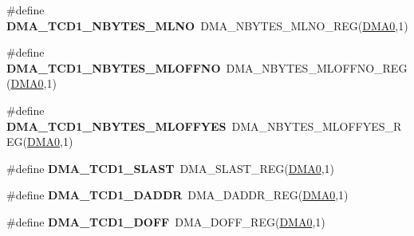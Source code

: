 \begin{DoxyCompactItemize}
\item 
\#define {\bfseries D\+M\+A\+\_\+\+T\+C\+D1\+\_\+\+N\+B\+Y\+T\+E\+S\+\_\+\+M\+L\+NO}~D\+M\+A\+\_\+\+N\+B\+Y\+T\+E\+S\+\_\+\+M\+L\+N\+O\+\_\+\+R\+EG(\hyperlink{group__DMA__Peripheral__Access__Layer_ga4103044f9ca209772f513dc694513ffb}{D\+M\+A0},1)\hypertarget{group__DMA__Register__Accessor__Macros_ga815c5f40d67ad04ac54fdb097ba16f7f}{}\label{group__DMA__Register__Accessor__Macros_ga815c5f40d67ad04ac54fdb097ba16f7f}

\item 
\#define {\bfseries D\+M\+A\+\_\+\+T\+C\+D1\+\_\+\+N\+B\+Y\+T\+E\+S\+\_\+\+M\+L\+O\+F\+F\+NO}~D\+M\+A\+\_\+\+N\+B\+Y\+T\+E\+S\+\_\+\+M\+L\+O\+F\+F\+N\+O\+\_\+\+R\+EG(\hyperlink{group__DMA__Peripheral__Access__Layer_ga4103044f9ca209772f513dc694513ffb}{D\+M\+A0},1)\hypertarget{group__DMA__Register__Accessor__Macros_gad6f0e77e436a6181f1de8a5c76f852e4}{}\label{group__DMA__Register__Accessor__Macros_gad6f0e77e436a6181f1de8a5c76f852e4}

\item 
\#define {\bfseries D\+M\+A\+\_\+\+T\+C\+D1\+\_\+\+N\+B\+Y\+T\+E\+S\+\_\+\+M\+L\+O\+F\+F\+Y\+ES}~D\+M\+A\+\_\+\+N\+B\+Y\+T\+E\+S\+\_\+\+M\+L\+O\+F\+F\+Y\+E\+S\+\_\+\+R\+EG(\hyperlink{group__DMA__Peripheral__Access__Layer_ga4103044f9ca209772f513dc694513ffb}{D\+M\+A0},1)\hypertarget{group__DMA__Register__Accessor__Macros_gabca874a7a0dda11149a7ffbc59fd4f67}{}\label{group__DMA__Register__Accessor__Macros_gabca874a7a0dda11149a7ffbc59fd4f67}

\item 
\#define {\bfseries D\+M\+A\+\_\+\+T\+C\+D1\+\_\+\+S\+L\+A\+ST}~D\+M\+A\+\_\+\+S\+L\+A\+S\+T\+\_\+\+R\+EG(\hyperlink{group__DMA__Peripheral__Access__Layer_ga4103044f9ca209772f513dc694513ffb}{D\+M\+A0},1)\hypertarget{group__DMA__Register__Accessor__Macros_gac992fd61ac9973b0084946fe63e7ace5}{}\label{group__DMA__Register__Accessor__Macros_gac992fd61ac9973b0084946fe63e7ace5}

\item 
\#define {\bfseries D\+M\+A\+\_\+\+T\+C\+D1\+\_\+\+D\+A\+D\+DR}~D\+M\+A\+\_\+\+D\+A\+D\+D\+R\+\_\+\+R\+EG(\hyperlink{group__DMA__Peripheral__Access__Layer_ga4103044f9ca209772f513dc694513ffb}{D\+M\+A0},1)\hypertarget{group__DMA__Register__Accessor__Macros_ga9de728ad39398928b18756cb20c98d18}{}\label{group__DMA__Register__Accessor__Macros_ga9de728ad39398928b18756cb20c98d18}

\item 
\#define {\bfseries D\+M\+A\+\_\+\+T\+C\+D1\+\_\+\+D\+O\+FF}~D\+M\+A\+\_\+\+D\+O\+F\+F\+\_\+\+R\+EG(\hyperlink{group__DMA__Peripheral__Access__Layer_ga4103044f9ca209772f513dc694513ffb}{D\+M\+A0},1)\hypertarget{group__DMA__Register__Accessor__Macros_ga5357bc3c3f4f2ed192af2623a8599918}{}\label{group__DMA__Register__Accessor__Macros_ga5357bc3c3f4f2ed192af2623a8599918}


\end{DoxyCompactItemize}
